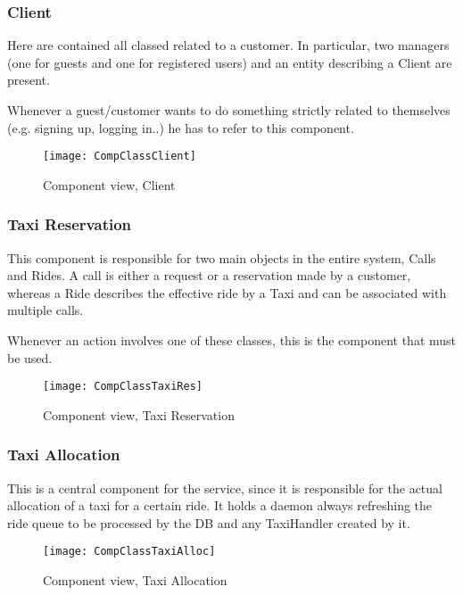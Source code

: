 \subsubsection{Client} %
Here are contained all classed related to a customer. In particular, two managers 
(one for guests and one for registered users) and an entity describing a Client are present. 

Whenever a guest/customer wants to do something strictly related to themselves 
(e.g. signing up, logging in..) he has to refer to this component.

\begin{figure}[H]
    \centering
    \texttt{[image: CompClassClient]}
    \caption{Component view, Client}
    \label{fig:compclassclient}
\end{figure}
        
\pagebreak
\subsubsection{Taxi Reservation} %
This component is responsible for two main objects in the entire system, Calls and Rides. 
A call is either a request or a reservation made by a customer, whereas a Ride describes 
the effective ride by a Taxi and can be associated with multiple calls. 

Whenever an action involves one of these classes, this is the component that must be used.
\vfill
\begin{figure}[H]
    \centering
    \texttt{[image: CompClassTaxiRes]}
    \caption{Component view, Taxi Reservation}
    \label{fig:compclasstaxires}
\end{figure}
\vfill
        
\pagebreak
\subsubsection{Taxi Allocation} %
This is a central component for the service, since it is responsible for the actual 
allocation of a taxi for a certain ride. It holds a daemon always refreshing 
the ride queue to be processed by the DB and any TaxiHandler created by it.


\begin{figure}[H]
    \centering
    \texttt{[image: CompClassTaxiAlloc]}
    \caption{Component view, Taxi Allocation}
    \label{fig:compclasstaxialloc}
\end{figure}

